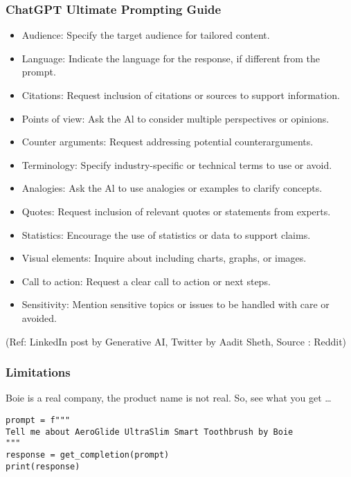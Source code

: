 \begin{frame}[fragile]\frametitle{ChatGPT Ultimate Prompting Guide}

\begin{itemize}
\item Audience: Specify the target audience for tailored content. 
\item Language: Indicate the language for the response, if different from the prompt. 
\item Citations: Request inclusion of citations or sources to support information. 
\item Points of view: Ask the Al to consider multiple perspectives or opinions. 
\item Counter arguments: Request addressing potential counterarguments. 
\item Terminology: Specify industry-specific or technical terms to use or avoid.
\item Analogies: Ask the Al to use analogies or examples to clarify concepts. 
\item Quotes: Request inclusion of relevant quotes or statements from experts. 
\item Statistics: Encourage the use of statistics or data to support claims. 
\item Visual elements: Inquire about including charts, graphs, or images. 
\item Call to action: Request a clear call to action or next steps. 
\item Sensitivity: Mention sensitive topics or issues to be handled with care or avoided. 
\end{itemize}	 


{\tiny (Ref: LinkedIn post by Generative AI, Twitter by Aadit Sheth, Source : Reddit)}
			

\end{frame}



\begin{frame}[fragile]\frametitle{Limitations}


Boie is a real company, the product name is not real. So, see what you get \ldots

\begin{lstlisting}
prompt = f"""
Tell me about AeroGlide UltraSlim Smart Toothbrush by Boie
"""
response = get_completion(prompt)
print(response)
\end{lstlisting}	 
		
\end{frame}



